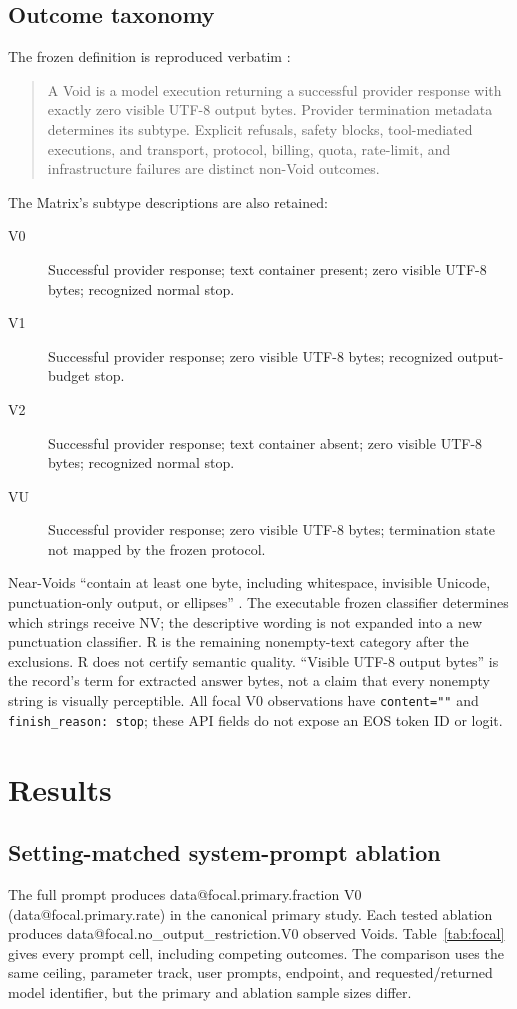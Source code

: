 \documentclass[11pt]{article}
\makeatletter
\newcommand{\D}[1]{\csname data@#1\endcsname}
\makeatother
\begin{document}
\subsection{Outcome taxonomy}
The frozen definition is reproduced verbatim \citep{pal_matrix,pal_synthesis}:
\begin{quote}
A Void is a model execution returning a successful provider response with exactly zero visible UTF-8 output bytes. Provider termination metadata determines its subtype. Explicit refusals, safety blocks, tool-mediated executions, and transport, protocol, billing, quota, rate-limit, and infrastructure failures are distinct non-Void outcomes.
\end{quote}
The Matrix's subtype descriptions are also retained:
\begin{description}
\item[V0] Successful provider response; text container present; zero visible UTF-8 bytes; recognized normal stop.
\item[V1] Successful provider response; zero visible UTF-8 bytes; recognized output-budget stop.
\item[V2] Successful provider response; text container absent; zero visible UTF-8 bytes; recognized normal stop.
\item[VU] Successful provider response; zero visible UTF-8 bytes; termination state not mapped by the frozen protocol.
\end{description}
Near-Voids ``contain at least one byte, including whitespace, invisible Unicode, punctuation-only output, or ellipses'' \citep{pal_matrix}. The executable frozen classifier determines which strings receive NV; the descriptive wording is not expanded into a new punctuation classifier. R is the remaining nonempty-text category after the exclusions. R does not certify semantic quality. ``Visible UTF-8 output bytes'' is the record's term for extracted answer bytes, not a claim that every nonempty string is visually perceptible. All focal V0 observations have \texttt{content=""} and \texttt{finish\_reason: stop}; these API fields do not expose an EOS token ID or logit.

\section{Results}
\subsection{Setting-matched system-prompt ablation}
The full prompt produces \D{focal.primary.fraction} V0 (\D{focal.primary.rate}) in the canonical primary study. Each tested ablation produces \D{focal.no_output_restriction.V0} observed Voids. Table~\ref{tab:focal} gives every prompt cell, including competing outcomes. The comparison uses the same ceiling, parameter track, user prompts, endpoint, and requested/returned model identifier, but the primary and ablation sample sizes differ.
\end{document}

